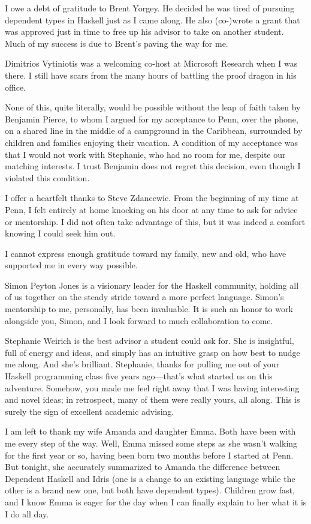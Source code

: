 I owe a debt of gratitude to Brent Yorgey. He decided he was tired
of pursuing dependent types in Haskell just as I came along. He also
(co-)wrote a grant that was approved just in time to free up his
advisor to take on another student. Much of my success is due to
Brent's paving the way for me.

Dimitrios Vytiniotis was a welcoming co-host at Microsoft Research
when I was there. I still have scars from the many hours of battling the
proof dragon in his office.

None of this, quite literally, would be possible without the leap
of faith taken by Benjamin Pierce, to whom I argued for my acceptance
to Penn, over the phone, on a shared line in the middle of a campground
in the Caribbean, surrounded by children and families enjoying
their vacation. A condition of my acceptance was that I would not work
with Stephanie, who had no room for me, despite our matching interests.
I trust Benjamin does not regret this decision, even though I violated
this condition.

I offer a heartfelt thanks to Steve Zdancewic. From the beginning of my
time at Penn, I felt entirely at home knocking on his door at any
time to ask for advice or mentorship. I did not often take advantage of this,
but it was indeed a comfort knowing I could seek him out.

I cannot express enough gratitude toward my family, new and old,
who have supported me in
every way possible.

Simon Peyton Jones is a visionary leader for the Haskell community,
holding all of us together on the steady stride toward a more perfect
language. Simon's mentorship to me, personally, has been invaluable.
It is such an honor to work alongside you, Simon, and I look
forward to much collaboration to come.

Stephanie Weirich is the best advisor a student could ask for. She is
insightful, full of energy and ideas, and simply has an intuitive
grasp on how best to nudge me along. And she's brilliant. Stephanie,
thanks for pulling me out of your Haskell programming class five years
ago---that's what started us on this adventure. Somehow, you made me
feel right away that I was having interesting and novel ideas; in
retrospect, many of them were really yours, all along. This is
surely the sign of excellent academic advising.

I am left to thank my wife Amanda and daughter Emma. Both have been
with me every step of the way. Well, Emma missed some steps as she wasn't
walking for the first year or so, having been born two months before
I started at Penn. But tonight, she accurately summarized to Amanda
the difference between Dependent Haskell and Idris (one is a change
to an existing language while the other is a brand new one, but both
have dependent types). Children grow fast, and I know Emma is eager for
the day when I can finally explain to her what it is I do all day.

